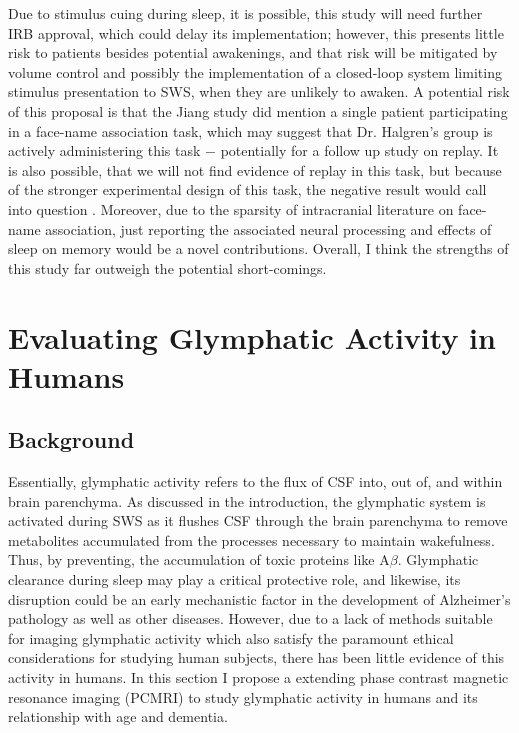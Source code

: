 Due to stimulus cuing during sleep, it is possible, this study will need further IRB approval, which could delay its implementation; however, this presents little risk to patients besides potential awakenings, and that risk will be mitigated by volume control and possibly the implementation of a closed-loop system limiting stimulus presentation to SWS, when they are unlikely to awaken. A potential risk of this proposal is that the Jiang study did mention a single patient participating in a face-name association task, which may suggest that Dr. Halgren's group is actively administering this task $-$ potentially for a follow up study on replay. It is also possible, that we will not find evidence of replay in this task, but because of the stronger experimental design of this task, the negative result would call into question \citep{Jiang2017}. Moreover, due to the sparsity of intracranial literature on face-name association, just reporting the associated neural processing and effects of sleep on memory would be a novel contributions. Overall, I think the strengths of this study far outweigh the potential short-comings.

\section*{Evaluating Glymphatic Activity in Humans}
\subsection*{Background}
Essentially, glymphatic activity refers to the flux of CSF into, out of, and within brain parenchyma. As discussed in the introduction, the glymphatic system is activated during SWS as it flushes CSF through the brain parenchyma to remove metabolites accumulated from the processes necessary to maintain wakefulness. Thus, by preventing, the accumulation of toxic proteins like A$\beta$. Glymphatic clearance during sleep may play a critical protective role, and likewise, its disruption could be an early mechanistic factor in the development of Alzheimer's pathology as well as other diseases. However, due to a lack of methods suitable for imaging glymphatic activity which also satisfy the paramount ethical considerations for studying human subjects, there has been little evidence of this activity in humans. In this section I propose a extending phase contrast magnetic resonance imaging (PCMRI) to study glymphatic activity in humans and its relationship with age and dementia.

